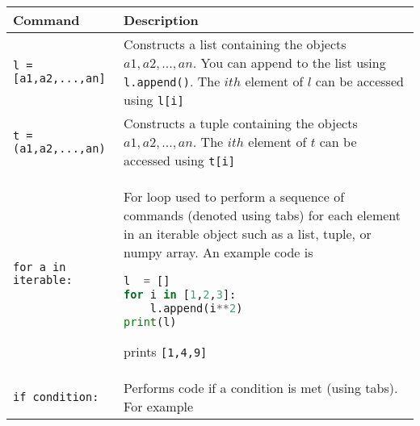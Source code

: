 \begin{tabular}[]{@{}ll@{}}
\toprule
\begin{minipage}[b]{0.17\columnwidth}\raggedright
Command
\end{minipage} & \begin{minipage}[b]{0.77\columnwidth}\raggedright
Description
\end{minipage}\tabularnewline
\midrule

\begin{minipage}[t]{0.17\columnwidth}\raggedright
\lstinline!l = [a1,a2,...,an]!
\end{minipage} & \begin{minipage}[t]{0.77\columnwidth}\raggedright
Constructs a list containing the objects \(a1,a2,...,an\). You can
append to the list using \lstinline!l.append()!. The \(ith\) element of
\(l\) can be accessed using \lstinline!l[i]!
\end{minipage}\tabularnewline
\begin{minipage}[t]{0.17\columnwidth}\raggedright
\lstinline!t =(a1,a2,...,an)!
\end{minipage} & \begin{minipage}[t]{0.77\columnwidth}\raggedright
Constructs a tuple containing the objects \(a1,a2,...,an\). The \(ith\)
element of \(t\) can be accessed using \lstinline!t[i]!
\end{minipage}\tabularnewline
\begin{minipage}[t]{0.17\columnwidth}\raggedright
\lstinline!for a in iterable:!
\end{minipage} & \begin{minipage}[t]{0.77\columnwidth}\raggedright
For loop used to perform a sequence of commands (denoted using tabs) for
each element in an iterable object such as a list, tuple, or numpy
array. An example code is

\begin{lstlisting}[language=Python]
l  = []
for i in [1,2,3]:
    l.append(i**2)
print(l)
\end{lstlisting}

prints \lstinline![1,4,9]!
\end{minipage}\tabularnewline
\begin{minipage}[t]{0.17\columnwidth}\raggedright
\lstinline!if condition:!
\end{minipage} & \begin{minipage}[t]{0.77\columnwidth}\raggedright
Performs code if a condition is met (using tabs). For example


\end{minipage}
\end{tabular}
